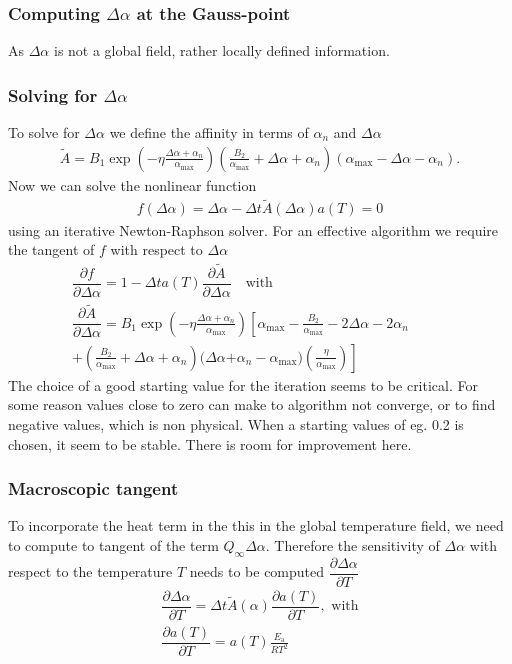 \subsubsection{Computing $\Delta\alpha$ at the Gauss-point}
As $\Delta\alpha$ is not a global field, rather locally defined information.
\subsubsection{Solving for $\Delta\alpha$}
To solve for $\Delta\alpha$ we define the affinity in terms of $\alpha_n$ and $\Delta\alpha$
\begin{align}
	\tilde{A} = B_1\exp\left(-\eta \frac{\Delta\alpha+\alpha_n}{\alpha_{\text{max}}}\right) \left(\tfrac{B_2}{\alpha_{\text{max}}} + \Delta\alpha+\alpha_n\right) (\alpha_{\text{max}} - \Delta\alpha - \alpha_n).
\end{align}
Now we can solve the nonlinear function 
\begin{align}
	f(\Delta\alpha) = \Delta\alpha - \Delta t \tilde{A}(\Delta\alpha)a(T) = 0
\end{align}
using an iterative Newton-Raphson solver. For an effective algorithm we require the tangent of $f$ with respect to $\Delta\alpha$
\begin{align}
	\dfrac{\partial f}{\partial \Delta\alpha} = 1 - \Delta t a(T) \dfrac{\partial\tilde{A}}{\partial \Delta\alpha} \quad\text{with}\\
	\dfrac{\partial\tilde{A}}{\partial \Delta\alpha} = B_1\exp\left(-\eta \frac{\Delta\alpha+\alpha_n}{\alpha_{\text{max}}}\right)\left[
	\alpha_{\text{max}} - \tfrac{B_2}{\alpha_{\text{max}}} - 2\Delta\alpha - 2 \alpha_n\right.\quad\quad&\nonumber\\
	+ (\tfrac{B_2}{\alpha_{\text{max}}} + \Delta\alpha+\alpha_n)(\Delta\alpha\left.+ \alpha_n - \alpha_{\text{max}})(\tfrac{\eta}{\alpha_{\text{max}}})\right]&
\end{align}
The choice of a good starting value for the iteration seems to be critical.
For some reason values close to zero can make to algorithm not converge, or to find negative values, which is non physical.
When a starting values of eg. 0.2 is chosen, it seem to be stable.
There is room for improvement here.
\subsubsection{Macroscopic tangent}
To incorporate the heat term in the this in the global temperature field, we need to compute to tangent of the term $Q_{\infty}\Delta\alpha$.
Therefore the sensitivity of $\Delta\alpha$ with respect to the temperature $T$ needs to be computed $\dfrac{\partial \Delta\alpha}{\partial T}$
\begin{align}
	\dfrac{\partial \Delta\alpha}{\partial T} = \Delta t \tilde{A}(\alpha)\dfrac{\partial a(T)}{\partial T},\text{ with}\\
	\dfrac{\partial a(T)}{\partial T} = a(T) \frac{E_{\text{a}}}{RT^2}
\end{align}

